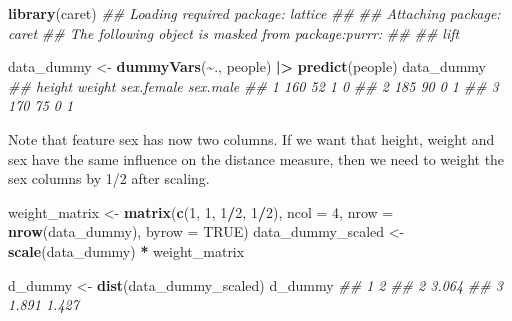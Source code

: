 \documentclass[
  notitlepage]{book}
\newenvironment{Shaded}{\begin{snugshade}}{\end{snugshade}}
\newcommand{\CommentTok}[1]{\textcolor[rgb]{0.56,0.35,0.01}{\textit{#1}}}
\newcommand{\DataTypeTok}[1]{\textcolor[rgb]{0.13,0.29,0.53}{#1}}
\newcommand{\DecValTok}[1]{\textcolor[rgb]{0.00,0.00,0.81}{#1}}
\newcommand{\ErrorTok}[1]{\textcolor[rgb]{0.64,0.00,0.00}{\textbf{#1}}}
\newcommand{\KeywordTok}[1]{\textcolor[rgb]{0.13,0.29,0.53}{\textbf{#1}}}
\newcommand{\NormalTok}[1]{#1}
\newcommand{\OperatorTok}[1]{\textcolor[rgb]{0.81,0.36,0.00}{\textbf{#1}}}
\newcommand{\OtherTok}[1]{\textcolor[rgb]{0.56,0.35,0.01}{#1}}
\newcommand{\StringTok}[1]{\textcolor[rgb]{0.31,0.60,0.02}{#1}}
\begin{document}
\begin{Shaded}
\begin{Highlighting}[]
\KeywordTok{library}\NormalTok{(caret)}
\CommentTok{\#\# Loading required package: lattice}
\CommentTok{\#\# }
\CommentTok{\#\# Attaching package: \textquotesingle{}caret\textquotesingle{}}
\CommentTok{\#\# The following object is masked from \textquotesingle{}package:purrr\textquotesingle{}:}
\CommentTok{\#\# }
\CommentTok{\#\#     lift}
\end{Highlighting}
\end{Shaded}

\begin{Shaded}
\begin{Highlighting}[]
\NormalTok{data\_dummy \textless{}{-}}\StringTok{ }\KeywordTok{dummyVars}\NormalTok{(}\OperatorTok{\textasciitilde{}}\NormalTok{., people) }\OperatorTok{|}\ErrorTok{\textgreater{}}\StringTok{ }
\StringTok{  }\KeywordTok{predict}\NormalTok{(people)}
\NormalTok{data\_dummy}
\CommentTok{\#\#   height weight sex.female sex.male}
\CommentTok{\#\# 1    160     52          1        0}
\CommentTok{\#\# 2    185     90          0        1}
\CommentTok{\#\# 3    170     75          0        1}
\end{Highlighting}
\end{Shaded}

Note that feature sex has now two columns. If we want that height,
weight and sex have the same influence on the distance measure, then we
need to weight the sex columns by 1/2 after scaling.

\begin{Shaded}
\begin{Highlighting}[]
\NormalTok{weight\_matrix \textless{}{-}}\StringTok{ }\KeywordTok{matrix}\NormalTok{(}\KeywordTok{c}\NormalTok{(}\DecValTok{1}\NormalTok{, }\DecValTok{1}\NormalTok{, }\DecValTok{1}\OperatorTok{/}\DecValTok{2}\NormalTok{, }\DecValTok{1}\OperatorTok{/}\DecValTok{2}\NormalTok{), }
                        \DataTypeTok{ncol =} \DecValTok{4}\NormalTok{, }
                        \DataTypeTok{nrow =} \KeywordTok{nrow}\NormalTok{(data\_dummy), }
                        \DataTypeTok{byrow =} \OtherTok{TRUE}\NormalTok{)}
\NormalTok{data\_dummy\_scaled \textless{}{-}}\StringTok{ }\KeywordTok{scale}\NormalTok{(data\_dummy) }\OperatorTok{*}\StringTok{ }\NormalTok{weight\_matrix}

\NormalTok{d\_dummy \textless{}{-}}\StringTok{ }\KeywordTok{dist}\NormalTok{(data\_dummy\_scaled)}
\NormalTok{d\_dummy}
\CommentTok{\#\#       1     2}
\CommentTok{\#\# 2 3.064      }
\CommentTok{\#\# 3 1.891 1.427}
\end{Highlighting}
\end{Shaded}
\end{document}
